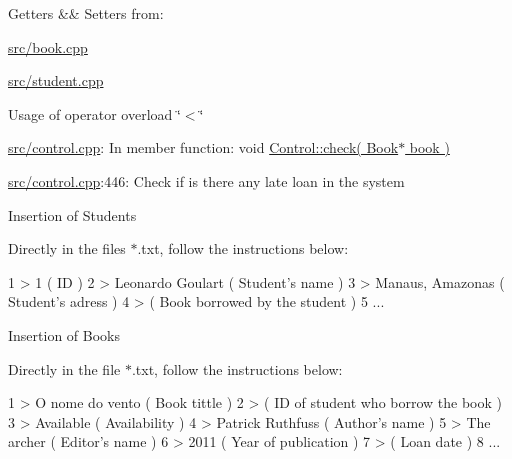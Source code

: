 \begin{DoxyItemize}
Getters \&\& Setters from\+:

\hyperlink{book_8cpp}{src/book.\+cpp}

\hyperlink{student_8cpp}{src/student.\+cpp}
\item Usage of operator overload \char`\"{}$<$\char`\"{}

\hyperlink{control_8cpp}{src/control.\+cpp}\+: In member function\+: \textquotesingle{}void \hyperlink{classControl_a234ad2973e4ad1e4cb9099f75dbdb05f}{Control\+::check( Book$\ast$ book )}\textquotesingle{}

\hyperlink{control_8cpp}{src/control.\+cpp}\+:446\+: Check if is there any late loan in the system
\item Insertion of Students

Directly in the files $\ast$.txt, follow the instructions below\+:
\end{DoxyItemize}


\begin{DoxyCode}
1 > 1             ( ID ) 
2 > Leonardo Goulart  ( Student's name )
3 > Manaus, Amazonas  ( Student's adress )
4 >           ( Book borrowed by the student )
5 ...
\end{DoxyCode}



\begin{DoxyItemize}
\item Insertion of Books

Directly in the file $\ast$.txt, follow the instructions below\+:
\end{DoxyItemize}


\begin{DoxyCode}
1 > O nome do vento   ( Book tittle )
2 >           ( ID of student who borrow the book )
3 > Available         ( Availability )
4 > Patrick Ruthfuss  ( Author's name )
5 > The archer        ( Editor's name )
6 > 2011          ( Year of publication )
7 >           ( Loan date )
8 ... 
\end{DoxyCode}
 